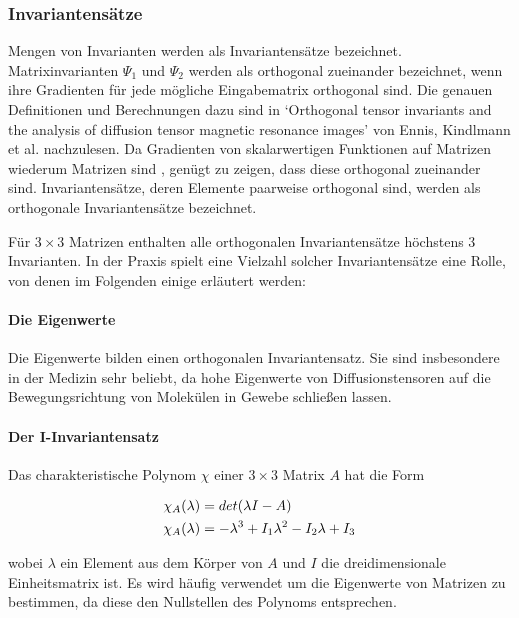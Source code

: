 \documentclass[a4paper,fontsize=12pt,toc=bib,halfparskip]{scrartcl}
\begin{document}
\subsubsection{Invariantens\"atze} 
\label{sec:Invariants}
Mengen von Invarianten werden als Invariantens\"atze bezeichnet.
Matrixinvarianten $\Psi_1$ und $\Psi_2$ werden als orthogonal zueinander bezeichnet, wenn ihre Gradienten f\"ur jede m\"ogliche Eingabematrix orthogonal sind. Die genauen Definitionen und Berechnungen dazu sind in `Orthogonal tensor invariants and the analysis of diffusion tensor magnetic resonance images' von Ennis, Kindlmann et al. \cite{ennis2006orthogonal} nachzulesen. Da Gradienten von skalarwertigen Funktionen auf Matrizen wiederum Matrizen sind \cite[S.~137]{ennis2006orthogonal}, gen\"ugt zu zeigen, dass diese orthogonal zueinander sind. Invariantens\"atze, deren Elemente paarweise orthogonal sind, werden als orthogonale Invariantens\"atze bezeichnet.

F\"ur $3\times 3$ Matrizen enthalten alle orthogonalen Invariantens\"atze h\"ochstens 3 Invarianten. In der Praxis spielt eine Vielzahl solcher Invariantens\"atze eine Rolle, von denen im Folgenden einige erl\"autert werden:

\paragraph{Die Eigenwerte}

Die Eigenwerte bilden einen orthogonalen Invariantensatz. Sie sind insbesondere in der Medizin sehr beliebt, da hohe Eigenwerte von Diffusionstensoren auf die Bewegungsrichtung von Molek\"ulen in Gewebe schlie{\ss}en lassen.

\paragraph{Der I-Invariantensatz}
Das charakteristische Polynom $\chi$ einer $3\times3$ Matrix $A$ hat die Form

\begin{equation}
	\centering
	\begin{split}
	&\chi_A(\lambda) = det(\lambda I - A)\\
	&\chi_A(\lambda) = -\lambda^3 + I_1\lambda^2 - I_2\lambda + I_3
	\end{split}
\end{equation}

wobei $\lambda$ ein Element aus dem K\"orper von $A$ und $I$ die dreidimensionale Einheitsmatrix ist. Es wird h\"aufig verwendet um die Eigenwerte von Matrizen zu bestimmen, da diese den Nullstellen des Polynoms entsprechen.
\end{document}
